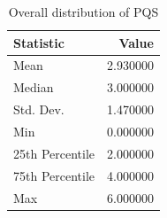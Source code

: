 \begin{table}
\caption{Overall distribution of PQS}
\label{tab:pqs-distribution}
\begin{tabular}{lr}
\toprule
Statistic & Value \\
\midrule
Mean & 2.930000 \\
Median & 3.000000 \\
Std. Dev. & 1.470000 \\
Min & 0.000000 \\
25th Percentile & 2.000000 \\
75th Percentile & 4.000000 \\
Max & 6.000000 \\
\bottomrule
\end{tabular}
\end{table}
